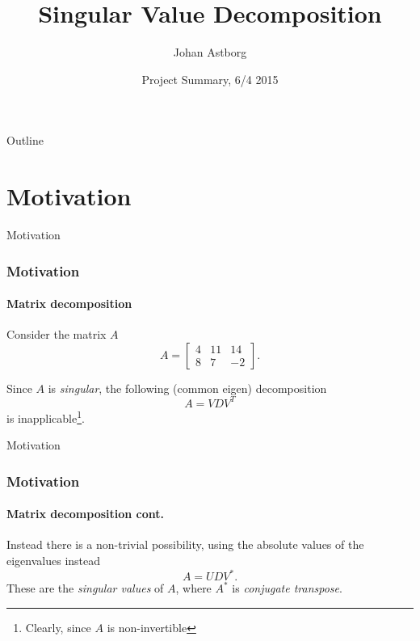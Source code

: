 \documentclass{beamer}
\title{Singular Value Decomposition}
\author{Johan Astborg}
\institute[Lund University]{Computational Programming with Python}
\date{Project Summary, 6/4 2015}
\begin{document}
\begin{frame}
  \titlepage
\end{frame}

\begin{frame}{Outline}
  \tableofcontents
\end{frame}

\section{Motivation}


\begin{frame}{Motivation}

\frametitle{Motivation}
\framesubtitle{Matrix decomposition}

Consider the matrix $A$
\begin{equation}
A = \begin{bmatrix}4 & 11 & 14 \\8 & 7 & -2 \end{bmatrix}.
\end{equation}

Since $A$ is \emph{singular}, the following (common eigen) decomposition
\begin{equation}
A=VDV^T
\end{equation}
is inapplicable\footnote{Clearly, since $A$ is non-invertible}.

\end{frame}


\begin{frame}{Motivation}

\frametitle{Motivation}
\framesubtitle{Matrix decomposition cont.}

Instead there is a non-trivial possibility, using the absolute values of the eigenvalues instead
\begin{equation}
A=UDV^* .
\end{equation}
These are the \emph{singular values} of $A$, where $A^*$ is \emph{conjugate transpose}.

\end{frame}
\end{document}

